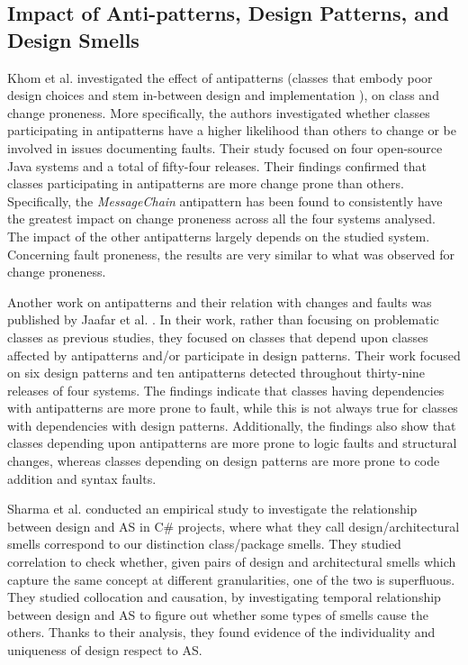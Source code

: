 \subsection{Impact of Anti-patterns, Design Patterns, and Design Smells}
Khom et al.  \cite{Khomh2012} investigated the effect of antipatterns (classes that embody poor design choices and stem in-between design and implementation \cite{Khomh2012}),  on class and change proneness. More specifically, the authors investigated whether classes participating in antipatterns have a higher likelihood than others to change or be involved in issues documenting faults.
Their study focused on four open-source Java systems and a total of fifty-four releases. Their findings confirmed that classes participating in antipatterns are more change prone than others. Specifically, the \emph{MessageChain} antipattern has been found to consistently have the greatest impact on change proneness across all the four systems analysed. The impact of the other antipatterns largely depends on the studied system.
Concerning fault proneness, the results are very similar to what was observed for change proneness.

Another work on antipatterns and their relation with changes and faults was published by Jaafar et al. \cite{Jaafar2016}.
In their work, rather than focusing on problematic classes as previous studies, they focused on classes that depend upon classes affected by antipatterns and/or participate in design patterns.
Their work focused on six design patterns and ten antipatterns detected throughout thirty-nine releases of four systems.
The findings indicate that classes having dependencies with antipatterns are more prone to fault, while this is not always true for classes with dependencies with design patterns.
Additionally, the findings also show that classes depending upon antipatterns are more prone to logic faults and structural changes, whereas classes depending on design patterns are more prone to code addition and syntax faults.

Sharma et al. \cite{Sharma2020} conducted an empirical study to investigate the relationship between design and AS in C\# projects, where what they call design/architectural smells correspond to our distinction class/package smells. They studied correlation to check whether, given pairs of design and architectural smells which capture the same concept at different granularities, one of the two is superfluous. They studied collocation and
causation, by investigating temporal relationship between design and AS to figure out whether some types of smells cause the others. Thanks to their analysis, they found evidence of the individuality and uniqueness of design respect to AS.


